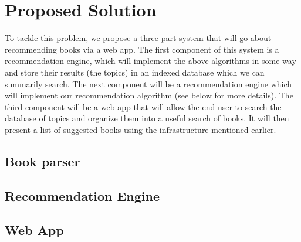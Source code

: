 
\section{Proposed Solution} 
To tackle this problem, we propose a three-part system that will go about recommending books via a web app.  
The first component of this system is a recommendation engine, which will implement the above algorithms in some way and store their results (the topics) in an indexed database which we can summarily search.  
The next component will be a recommendation engine which will implement our recommendation algorithm (see below for more details).  
The third component will be a web app that will allow the end-user to search the database of topics and organize them into a useful search of books.  
It will then present a list of suggested books using the infrastructure mentioned earlier.  

\subsection{Book parser} \label{section:book-parser}


\subsection{Recommendation Engine} \label{section:recommendation_engine}

\subsection{Web App} \label{section:webapp}